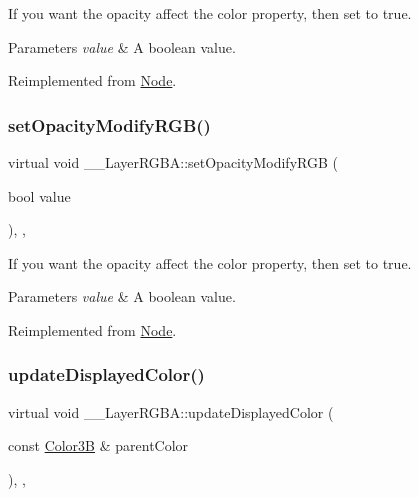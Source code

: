 If you want the opacity affect the color property, then set to true. 
\begin{DoxyParams}{Parameters}
{\em value} & A boolean value. \\
\hline
\end{DoxyParams}


Reimplemented from \hyperlink{classNode_a978c5435ab23f76e9efdf0f7e9e288e5}{Node}.

\mbox{\label{class____LayerRGBA_a04037a60b1a1f9d5ba2760252ad2da35}} 
\subsubsection{\texorpdfstring{set\+Opacity\+Modify\+R\+G\+B()}{setOpacityModifyRGB()}\hspace{0.1cm}{\footnotesize\ttfamily [2/2]}}
{\footnotesize\ttfamily virtual void \+\_\+\+\_\+\+Layer\+R\+G\+B\+A\+::set\+Opacity\+Modify\+R\+GB (\begin{DoxyParamCaption}\item[{bool}]{value }\end{DoxyParamCaption})\hspace{0.3cm}{\ttfamily [inline]}, {\ttfamily [override]}, {\ttfamily [virtual]}}

If you want the opacity affect the color property, then set to true. 
\begin{DoxyParams}{Parameters}
{\em value} & A boolean value. \\
\hline
\end{DoxyParams}


Reimplemented from \hyperlink{classNode_a978c5435ab23f76e9efdf0f7e9e288e5}{Node}.

\mbox{\label{class____LayerRGBA_aa0406779f58fc6586f51129bee7aed36}} 
\subsubsection{\texorpdfstring{update\+Displayed\+Color()}{updateDisplayedColor()}\hspace{0.1cm}{\footnotesize\ttfamily [1/2]}}
{\footnotesize\ttfamily virtual void \+\_\+\+\_\+\+Layer\+R\+G\+B\+A\+::update\+Displayed\+Color (\begin{DoxyParamCaption}\item[{const \hyperlink{structColor3B}{Color3B} \&}]{parent\+Color }\end{DoxyParamCaption})\hspace{0.3cm}{\ttfamily [inline]}, {\ttfamily [override]}, {\ttfamily [virtual]}}

